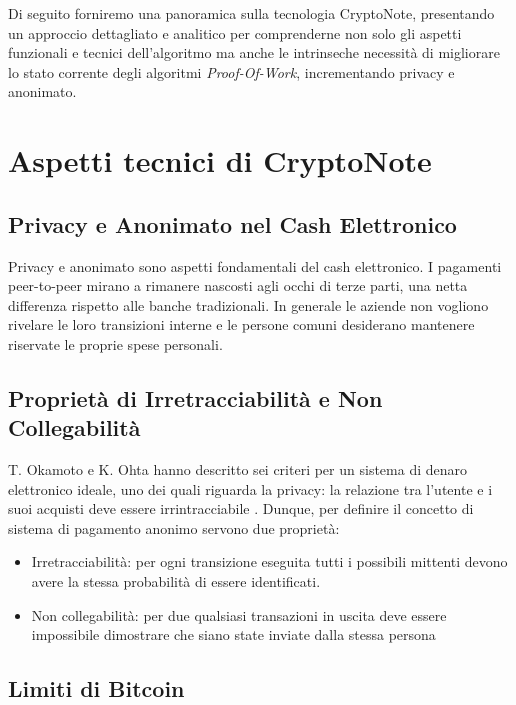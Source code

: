 Di seguito forniremo una panoramica sulla tecnologia CryptoNote,
presentando un approccio dettagliato e analitico per comprenderne non
solo gli aspetti funzionali e tecnici dell'algoritmo ma anche le
intrinseche necessità di migliorare lo stato corrente degli algoritmi
\emph{Proof-Of-Work}, incrementando privacy e anonimato.

\section{Aspetti tecnici di
CryptoNote}\label{aspetti-tecnici-di-cryptonote}

\subsection{Privacy e Anonimato nel Cash
Elettronico}\label{privacy-e-anonimato-nel-cash-elettronico}

Privacy e anonimato sono aspetti fondamentali del cash elettronico. I
pagamenti peer-to-peer mirano a rimanere nascosti agli occhi di terze
parti, una netta differenza rispetto alle banche tradizionali. In
generale le aziende non vogliono rivelare le loro transizioni interne e
le persone comuni desiderano mantenere riservate le proprie spese
personali.

\subsection{Proprietà di Irretracciabilità e Non
Collegabilità}\label{proprieta-di-irretracciabilita-e-non-collegabilita}

T. Okamoto e K. Ohta hanno descritto sei criteri per un sistema di
denaro elettronico ideale, uno dei quali riguarda la privacy: la
relazione tra l'utente e i suoi acquisti deve essere irrintracciabile
\cite{okamoto1991universal}. Dunque, per definire il concetto di sistema di pagamento
anonimo servono due proprietà:

\begin{itemize}
\item
  Irretracciabilità: per ogni transizione eseguita tutti i possibili
  mittenti devono avere la stessa probabilità di essere identificati.
\item
  Non collegabilità: per due qualsiasi transazioni in uscita deve essere
  impossibile dimostrare che siano state inviate dalla stessa persona
\end{itemize}

\subsection{Limiti di Bitcoin}\label{limiti-di-bitcoin}

